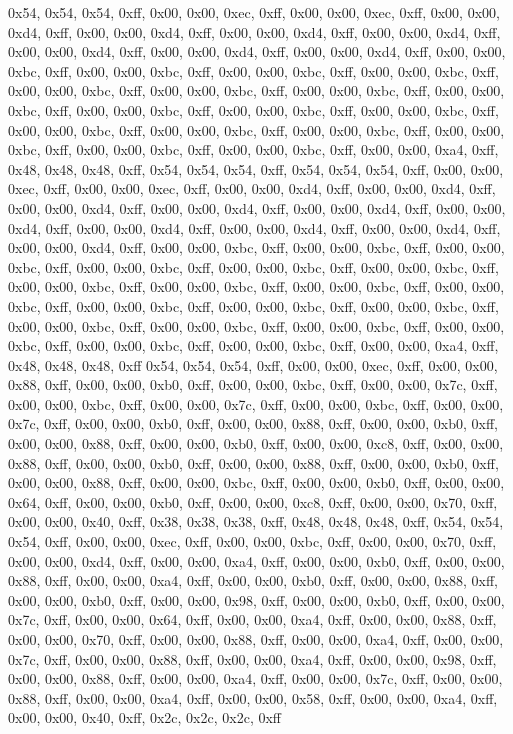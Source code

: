 0x54, 0x54, 0x54, 0xff, 0x00, 0x00, 0xec, 0xff, 0x00, 0x00, 0xec, 0xff, 0x00, 0x00, 0xd4, 0xff, 0x00, 0x00, 0xd4, 0xff, 0x00, 0x00, 0xd4, 0xff, 0x00, 0x00, 0xd4, 0xff, 0x00, 0x00, 0xd4, 0xff, 0x00, 0x00, 0xd4, 0xff, 0x00, 0x00, 0xd4, 0xff, 0x00, 0x00, 0xbc, 0xff, 0x00, 0x00, 0xbc, 0xff, 0x00, 0x00, 0xbc, 0xff, 0x00, 0x00, 0xbc, 0xff, 0x00, 0x00, 0xbc, 0xff, 0x00, 0x00, 0xbc, 0xff, 0x00, 0x00, 0xbc, 0xff, 0x00, 0x00, 0xbc, 0xff, 0x00, 0x00, 0xbc, 0xff, 0x00, 0x00, 0xbc, 0xff, 0x00, 0x00, 0xbc, 0xff, 0x00, 0x00, 0xbc, 0xff, 0x00, 0x00, 0xbc, 0xff, 0x00, 0x00, 0xbc, 0xff, 0x00, 0x00, 0xbc, 0xff, 0x00, 0x00, 0xbc, 0xff, 0x00, 0x00, 0xbc, 0xff, 0x00, 0x00, 0xa4, 0xff, 0x48, 0x48, 0x48, 0xff, 0x54, 0x54, 0x54, 0xff, 0x54, 0x54, 0x54, 0xff, 0x00, 0x00, 0xec, 0xff, 0x00, 0x00, 0xec, 0xff, 0x00, 0x00, 0xd4, 0xff, 0x00, 0x00, 0xd4, 0xff, 0x00, 0x00, 0xd4, 0xff, 0x00, 0x00, 0xd4, 0xff, 0x00, 0x00, 0xd4, 0xff, 0x00, 0x00, 0xd4, 0xff, 0x00, 0x00, 0xd4, 0xff, 0x00, 0x00, 0xd4, 0xff, 0x00, 0x00, 0xd4, 0xff, 0x00, 0x00, 0xd4, 0xff, 0x00, 0x00, 0xbc, 0xff, 0x00, 0x00, 0xbc, 0xff, 0x00, 0x00, 0xbc, 0xff, 0x00, 0x00, 0xbc, 0xff, 0x00, 0x00, 0xbc, 0xff, 0x00, 0x00, 0xbc, 0xff, 0x00, 0x00, 0xbc, 0xff, 0x00, 0x00, 0xbc, 0xff, 0x00, 0x00, 0xbc, 0xff, 0x00, 0x00, 0xbc, 0xff, 0x00, 0x00, 0xbc, 0xff, 0x00, 0x00, 0xbc, 0xff, 0x00, 0x00, 0xbc, 0xff, 0x00, 0x00, 0xbc, 0xff, 0x00, 0x00, 0xbc, 0xff, 0x00, 0x00, 0xbc, 0xff, 0x00, 0x00, 0xbc, 0xff, 0x00, 0x00, 0xbc, 0xff, 0x00, 0x00, 0xbc, 0xff, 0x00, 0x00, 0xa4, 0xff, 0x48, 0x48, 0x48, 0xff
0x54, 0x54, 0x54, 0xff, 0x00, 0x00, 0xec, 0xff, 0x00, 0x00, 0x88, 0xff, 0x00, 0x00, 0xb0, 0xff, 0x00, 0x00, 0xbc, 0xff, 0x00, 0x00, 0x7c, 0xff, 0x00, 0x00, 0xbc, 0xff, 0x00, 0x00, 0x7c, 0xff, 0x00, 0x00, 0xbc, 0xff, 0x00, 0x00, 0x7c, 0xff, 0x00, 0x00, 0xb0, 0xff, 0x00, 0x00, 0x88, 0xff, 0x00, 0x00, 0xb0, 0xff, 0x00, 0x00, 0x88, 0xff, 0x00, 0x00, 0xb0, 0xff, 0x00, 0x00, 0xc8, 0xff, 0x00, 0x00, 0x88, 0xff, 0x00, 0x00, 0xb0, 0xff, 0x00, 0x00, 0x88, 0xff, 0x00, 0x00, 0xb0, 0xff, 0x00, 0x00, 0x88, 0xff, 0x00, 0x00, 0xbc, 0xff, 0x00, 0x00, 0xb0, 0xff, 0x00, 0x00, 0x64, 0xff, 0x00, 0x00, 0xb0, 0xff, 0x00, 0x00, 0xc8, 0xff, 0x00, 0x00, 0x70, 0xff, 0x00, 0x00, 0x40, 0xff, 0x38, 0x38, 0x38, 0xff, 0x48, 0x48, 0x48, 0xff, 0x54, 0x54, 0x54, 0xff, 0x00, 0x00, 0xec, 0xff, 0x00, 0x00, 0xbc, 0xff, 0x00, 0x00, 0x70, 0xff, 0x00, 0x00, 0xd4, 0xff, 0x00, 0x00, 0xa4, 0xff, 0x00, 0x00, 0xb0, 0xff, 0x00, 0x00, 0x88, 0xff, 0x00, 0x00, 0xa4, 0xff, 0x00, 0x00, 0xb0, 0xff, 0x00, 0x00, 0x88, 0xff, 0x00, 0x00, 0xb0, 0xff, 0x00, 0x00, 0x98, 0xff, 0x00, 0x00, 0xb0, 0xff, 0x00, 0x00, 0x7c, 0xff, 0x00, 0x00, 0x64, 0xff, 0x00, 0x00, 0xa4, 0xff, 0x00, 0x00, 0x88, 0xff, 0x00, 0x00, 0x70, 0xff, 0x00, 0x00, 0x88, 0xff, 0x00, 0x00, 0xa4, 0xff, 0x00, 0x00, 0x7c, 0xff, 0x00, 0x00, 0x88, 0xff, 0x00, 0x00, 0xa4, 0xff, 0x00, 0x00, 0x98, 0xff, 0x00, 0x00, 0x88, 0xff, 0x00, 0x00, 0xa4, 0xff, 0x00, 0x00, 0x7c, 0xff, 0x00, 0x00, 0x88, 0xff, 0x00, 0x00, 0xa4, 0xff, 0x00, 0x00, 0x58, 0xff, 0x00, 0x00, 0xa4, 0xff, 0x00, 0x00, 0x40, 0xff, 0x2c, 0x2c, 0x2c, 0xff
